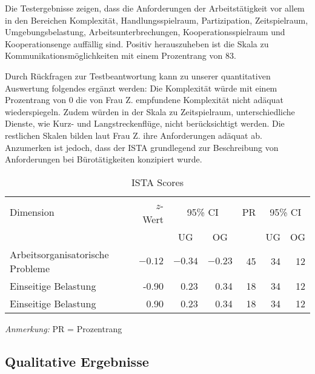 \documentclass[12pt, a4paper]{article}
\begin{document}
Die Testergebnisse zeigen, dass die Anforderungen der Arbeitstätigkeit vor allem in den Bereichen Komplexität, Handlungsspielraum, Partizipation, 
Zeitspielraum, Umgebungsbelastung, Arbeitsunterbrechungen, Kooperationsspielraum und Kooperationsenge auffällig sind.
Positiv herauszuheben ist die Skala zu Kommunikationsmöglichkeiten mit einem Prozentrang von 83.

Durch Rückfragen zur Testbeantwortung kann zu unserer quantitativen Auswertung folgendes ergänzt werden: 
Die Komplexität würde mit einem Prozentrang von 0 die von Frau Z. empfundene Komplexität nicht adäquat wiederspiegeln. 
Zudem würden in der Skala zu Zeitspielraum, unterschiedliche Dienste, wie Kurz- und Langstreckenflüge, nicht berücksichtigt werden. 
Die restlichen Skalen bilden laut Frau Z. ihre Anforderungen adäquat ab. 
Anzumerken ist jedoch, dass der ISTA grundlegend zur Beschreibung von Anforderungen bei Bürotätigkeiten konzipiert wurde.

\begin{table}[h]
    \centering
    \begin{threeparttable}
    \caption{ISTA Scores}
    \begin{tabular}{lrrrrrr}
        \toprule
        Dimension & {$z$-Wert} & \multicolumn{2}{c}{95\% CI}  & PR & \multicolumn{2}{c}{95\% CI} \\
        \cmidrule(lr){3-4} \cmidrule(lr){6-7}
         & & \multicolumn{1}{c}{UG}  & \multicolumn{1}{c}{OG} & & \multicolumn{1}{c}{UG} & \multicolumn{1}{c}{OG} \\
        \midrule
        Arbeitsorganisatorische Probleme & $-0.12$ & $-0.34$ & $-0.23$ & 45 & 34 & 12\\
        Einseitige Belastung & -0.90 & 0.23 & 0.34 & 18 & 34 & 12 \\
        Einseitige Belastung & 0.90 & 0.23 & 0.34 & 18 & 34 & 12 \\
        \bottomrule
    \end{tabular}
    \begin{tablenotes}[flushleft]
        \small
        \item \textit{Anmerkung:} PR = Prozentrang
    \end{tablenotes}
    \end{threeparttable}
\end{table}

\subsection{Qualitative Ergebnisse}
\end{document}
